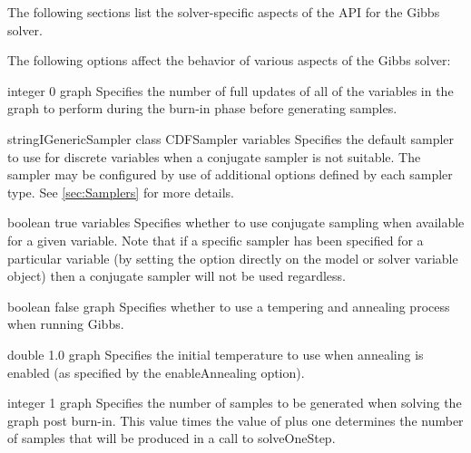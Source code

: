 The following sections list the solver-specific aspects of the API for the Gibbs solver.

\label{sec:GibbsOptions}

The following options affect the behavior of various aspects of the Gibbs solver:


{integer}
{0}
{graph}
{Specifies the number of full updates of all of the variables in the graph to perform during the burn-in phase before generating samples.}


{\ifmatlab string\fi \ifjava IGenericSampler class\fi}
{CDFSampler}
{variables}
{Specifies the default sampler to use for discrete variables when a conjugate sampler is not  suitable. The sampler may be configured by use of additional options defined by each sampler type. See \autoref{sec:Samplers} for more details.}


{boolean}
{true}
{variables}
{Specifies whether to use conjugate sampling when available for a given variable. Note that if a specific sampler has been specified for a particular variable (by setting the  option directly on the model or solver variable object) then a conjugate sampler will not be used regardless.}


{boolean}
{false}
{graph}
{Specifies whether to use a tempering and annealing process when running Gibbs.}


{double}
{1.0}
{graph}
{Specifies the initial temperature to use when annealing is enabled (as specified by the enableAnnealing option).}


{integer}
{1}
{graph}
{Specifies the number of samples to be generated when solving the graph post burn-in. This value times the value of  plus one determines the number of samples that will be produced in a call to solveOneStep.}

